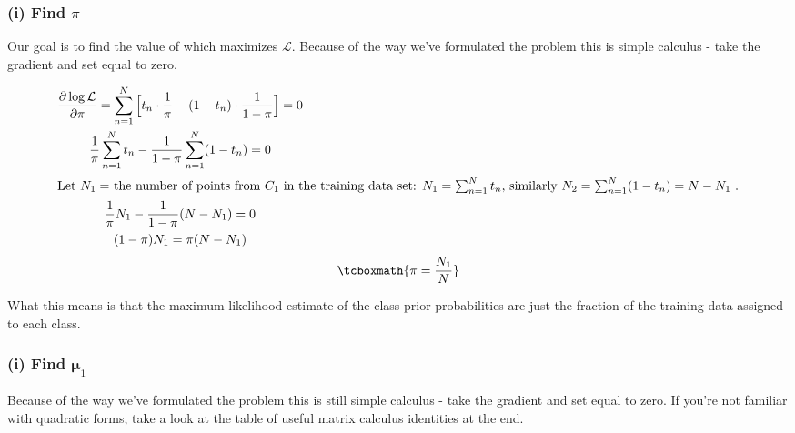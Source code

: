 \documentclass[11pt]{article}
\newcommand{\ub}{\symbf{\mu}}
\begin{document}
\begin{framed}
\subsubsection*{(i) Find $\pi$}
Our goal is to find the value of \pi which maximizes $\mathcal{L}$. Because of the way we've formulated the problem this is
simple calculus - take the gradient and set equal to zero.

\begin{gather*}
	\frac{\partial \log \mathcal{L}}{\partial \pi} = \sum_{n=1}^N \Big[ t_n \cdot \frac{1}{\pi} - (1 - t_n) \cdot \frac{1}{1 - \pi} \Big] = 0 \\
	\frac{1}{\pi} \sum_{n=1}^{N} t_n - \frac{1}{1-\pi} \sum_{n=1}^N (1 - t_n) = 0 \\
	\intertext{Let $N_1 = $ the number of points from $C_1$ in the training data set: $N_1 = \sum_{n=1}^N t_n$, similarly $N_2 = \sum_{n=1}^N (1 -  t_n) = N - N_1$ .}
	\frac{1}{\pi} N_1 - \frac{1}{1-\pi} (N - N_1) = 0 \\
	(1 - \pi) N_1 = \pi (N - N_1)  \\
\end{gather*}
\begin{equation}
	\tcboxmath{\pi = \frac{N_1}{N}}
\end{equation}

What this means is that the maximum likelihood estimate of the class prior probabilities are just the fraction of the training data assigned to each class.


\subsubsection*{(i) Find $\ub_1$}
 Because of the way we've formulated the problem this is still simple calculus - take the gradient and set equal to zero.
 If you're not familiar with quadratic forms, take a look at the table of useful matrix calculus identities at the end.


\end{framed}
\end{document}
